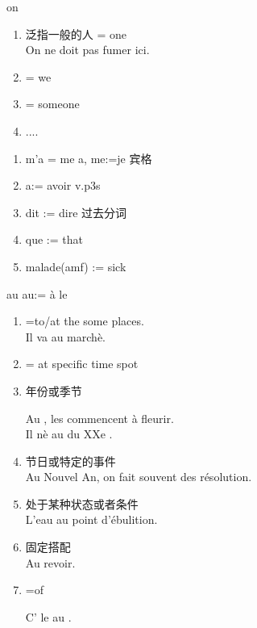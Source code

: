 \documentclass[../templates/main.tex]{subfiles}
\begin{document}
\date{le jeu.08 aôut 2024}
\begin{grammar}{on}
	\begin{enumerate}
		\item 泛指一般的人 = one\\
		      On ne doit pas fumer ici.
		\item = we\\
		\item = someone\\
		\item ....
	\end{enumerate}
\end{grammar}
\begin{sentence}\label{se:Omdq}
	\begin{enumerate}
		\item m'a = me a, me:=je 宾格
		\item a:= avoir v.p3s
		\item dit := dire 过去分词
		\item que := that
		\item malade(amf) := sick
	\end{enumerate}
\end{sentence}
\begin{grammar}{au}
	au:= à le
	\begin{enumerate}
		\item =to/at the some places.\\
		      Il va au marchè.
		\item = at specific time spot\\
		\item 年份或季节\\
		      \begin{french}
			      Au , les  commencent à fleurir.\\
			      Il  nè au  du XXe .
		      \end{french}
		\item 节日或特定的事件\\
		      Au Nouvel An, on fait souvent des résolution.
		\item 处于某种状态或者条件\\
		      L'eau au point d'ébulition.
		\item 固定搭配\\
		      Au revoir.
		\item =of\\
		      \begin{french}
			      C' le  au .
		      \end{french}
	\end{enumerate}
\end{grammar}
\end{document}
